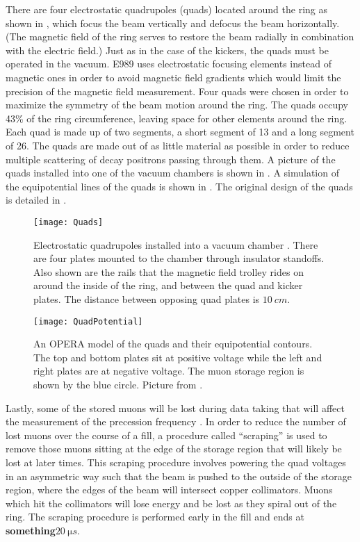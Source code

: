 There are four electrostatic quadrupoles (quads) located around the ring as shown in , which focus the beam vertically and defocus the beam horizontally. (The magnetic field of the ring serves to restore the beam radially in combination with the electric field.) Just as in the case of the kickers, the quads must be operated in the vacuum. E989 uses electrostatic focusing elements instead of magnetic ones in order to avoid magnetic field gradients which would limit the precision of the magnetic field measurement. Four quads were chosen in order to maximize the symmetry of the beam motion around the ring. The quads occupy 43\% of the ring circumference, leaving space for other elements around the ring. Each quad is made up of two segments, a short segment of 13\textdegree{} and a long segment of 26\textdegree{}. The quads are made out of as little material as possible in order to reduce multiple scattering of decay positrons passing through them. A picture of the quads installed into one of the vacuum chambers is shown in . A simulation of the equipotential lines of the quads is shown in . The original design of the quads is detailed in .

\begin{figure}[]
    \centering
    \texttt{[image: Quads]}
    \caption[Electrostatic quadrupoles installed in a vacuum chamber]{Electrostatic quadrupoles installed into a vacuum chamber \cite{QuadsE821}. There are four plates mounted to the chamber through insulator standoffs. Also shown are the rails that the magnetic field trolley rides on around the inside of the ring, and between the quad and kicker plates. The distance between opposing quad plates is $\SI{10}{cm}$.}
    \label{fig:Quads}
\end{figure}

\begin{figure}[]
    \centering
    \texttt{[image: QuadPotential]}
    \caption[Electrostatic quadrupole potentials]{An OPERA model of the quads and their equipotential contours. The top and bottom plates sit at positive voltage while the left and right plates are at negative voltage. The muon storage region is shown by the blue circle. Picture from .}   
    \label{fig:QuadPotential}
\end{figure}


Lastly, some of the stored muons will be lost during data taking that will affect the measurement of the precession frequency \wa. In order to reduce the number of lost muons over the course of a fill, a procedure called ``scraping'' is used to remove those muons sitting at the edge of the storage region that will likely be lost at later times. This scraping procedure involves powering the quad voltages in an asymmetric way such that the beam is pushed to the outside of the storage region, where the edges of the beam will intersect copper collimators. Muons which hit the collimators will lose energy and be lost as they spiral out of the ring. The scraping procedure is performed early in the fill and ends at \textbf{something}$\SI{20}{\micro s}$. 




